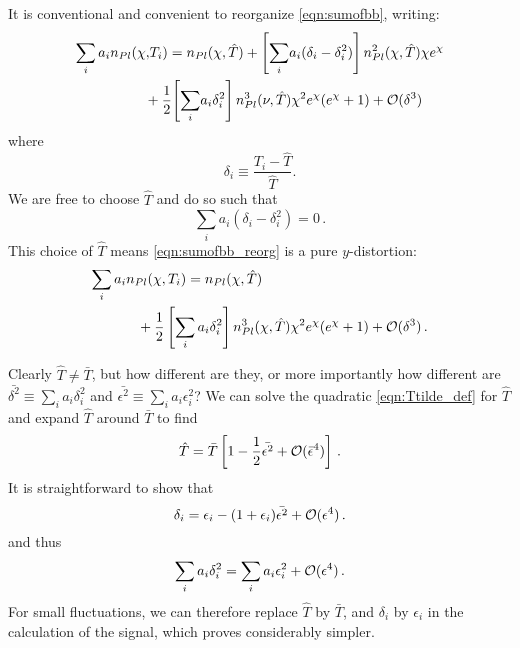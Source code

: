 \documentclass[fleqn,usenatbib]{mnras}
\begin{document}
    It is conventional \citep{Chluba+2012} and convenient to reorganize
    \autoref{eqn:sumofbb}, writing:
    \begin{align} \label{eqn:sumofbb_reorg}
        \sum_i a_i n_{Pl}(\chi,\!T_i)
            &=   n_{Pl}(\chi,\hat{T})
               + \left[\sum_i \! a_i (\delta_i - \delta_i^2)\right] n_{Pl}^2(\chi,\hat{T}) \chi e^\chi \nonumber
            \\ &\!\!\!\!\!\!\!\!\!\!
               + \frac{1}{2}\!\left[\sum_i \! a_i \delta_i^2\right] n_{Pl}^3(\nu,\hat{T}) \chi^2
               e^\chi (e^\chi +1)
               + \mcal{O}(\delta^3)
    \end{align}
    where 
    \begin{equation}
        \delta_i\equiv\frac{T_i-\hat{T}}{\hat{T}}.
    \end{equation}
    We are free to choose $\hat{T}$ and do so such that  
    \begin{equation} \label{eqn:Ttilde_def}
        \sum_i a_i (\delta_i - \delta_i^2) = 0\,.
    \end{equation}
    This choice of $\hat{T}$ means \autoref{eqn:sumofbb_reorg} is a pure
    $y$-distortion:
    \begin{align}
        \sum_i a_i & n_{Pl}(\chi,T_i) =
            n_{Pl}(\chi,\hat{T}) \\ &\phantom{=} 
            + \frac{1}{2}\left[\sum_i a_i \delta_i^2\right]n_{Pl}^3(\chi,\hat{T}) \chi^2 e^\chi (e^\chi +1)
            + \mathcal{O}(\delta^3)\,. \nonumber
    \end{align}

    Clearly $\hat{T}\neq\bar{T}$, but how different are they, or more
    importantly how different are $\bar{\delta^2}\equiv\sum_i a_i \delta_i^2$
    and $\bar{\epsilon^2}\equiv\sum_i a_i \epsilon_i^2$? We can solve the
    quadratic  \autoref{eqn:Ttilde_def} for $\hat{T}$ and expand $\hat{T}$
    around $\bar{T}$ to find
    \begin{equation}
        \hat{T} = \bar{T} \left[
                  1
                - \frac{1}{2}\bar{\epsilon^2}
                + {\cal{O}}(\bar{\epsilon}^4)
            \right] \,.
    \end{equation}
    It is straightforward to show that
    \begin{equation}
        \delta_i = \epsilon_i - (1+\epsilon_i) \bar{\epsilon^2} + {\cal{O}}(\epsilon^4)\,.
    \end{equation}
    and thus
    \begin{equation}
        \sum_i a_i\delta_i^2 = \sum_i a_i\epsilon_i^2 + {\cal{O}}(\epsilon^4)\,.
    \end{equation}
    For small fluctuations, we can therefore replace $\hat{T}$ by $\bar{T}$, and
    $\delta_i$ by $\epsilon_i$ in the calculation of the signal, which proves
    considerably simpler.
\end{document}
